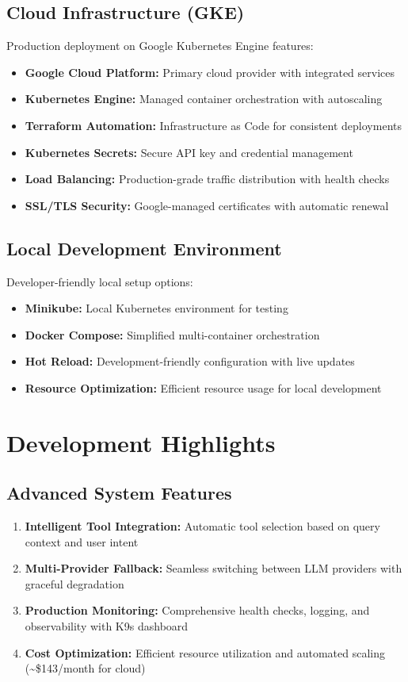 \documentclass[11pt,a4paper]{article}
\begin{document}
\subsection{Cloud Infrastructure (GKE)}
Production deployment on Google Kubernetes Engine features:
\begin{itemize}[itemsep=0.3em]
    \item \textbf{Google Cloud Platform:} Primary cloud provider with integrated services
    \item \textbf{Kubernetes Engine:} Managed container orchestration with autoscaling
    \item \textbf{Terraform Automation:} Infrastructure as Code for consistent deployments
    \item \textbf{Kubernetes Secrets:} Secure API key and credential management
    \item \textbf{Load Balancing:} Production-grade traffic distribution with health checks
    \item \textbf{SSL/TLS Security:} Google-managed certificates with automatic renewal
\end{itemize}

\subsection{Local Development Environment}
Developer-friendly local setup options:
\begin{itemize}[itemsep=0.3em]
    \item \textbf{Minikube:} Local Kubernetes environment for testing
    \item \textbf{Docker Compose:} Simplified multi-container orchestration
    \item \textbf{Hot Reload:} Development-friendly configuration with live updates
    \item \textbf{Resource Optimization:} Efficient resource usage for local development
\end{itemize}

\newpage
\section{Development Highlights}

\subsection{Advanced System Features}
\begin{enumerate}[itemsep=0.3em]
    \item \textbf{Intelligent Tool Integration:} Automatic tool selection based on query context and user intent
    \item \textbf{Multi-Provider Fallback:} Seamless switching between LLM providers with graceful degradation
    \item \textbf{Production Monitoring:} Comprehensive health checks, logging, and observability with K9s dashboard
    \item \textbf{Cost Optimization:} Efficient resource utilization and automated scaling (\textasciitilde\$143/month for cloud)
\end{enumerate}
\end{document}
